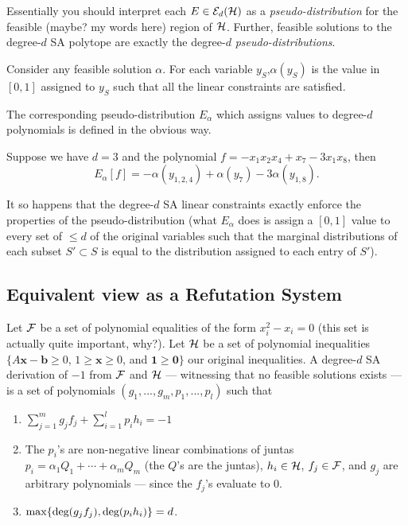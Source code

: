 Essentially you should interpret each $E \in \mathcal{E}_d(\mathcal{H})$ as a \emph{pseudo-distribution} for the feasible (maybe? my words here) region of $\mathcal{H}$. Further, feasible solutions to the degree-$d$ SA polytope are exactly the degree-$d$ \emph{pseudo-distributions}.

Consider any feasible solution $\alpha$. For each variable $y_S$,$\alpha(y_S)$ is the value in $[0,1]$ assigned to $y_S$ such that all the linear constraints are satisfied.

The corresponding pseudo-distribution $E_{\alpha}$ which assigns values to degree-$d$ polynomials is defined in the obvious way.
\begin{example}
Suppose we have $d = 3$ and the polynomial $f = -x_1x_2x_4 + x_7 - 3x_1x_8$, then
\[E_{\alpha}[f] = -\alpha(y_{1,2,4}) + \alpha(y_{7}) -3\alpha(y_{1,8}).\]
\end{example}
It so happens that the degree-$d$ SA linear constraints exactly enforce the properties of the pseudo-distribution (what $E_{\alpha}$ does is assign a $[0,1]$ value to every set of $\leq d$ of the original variables such that the marginal distributions of each subset $S' \subset S$ is equal to the distribution assigned to each entry of $S'$). 

\subsection{Equivalent view as a Refutation System}
Let $\mathcal{F}$ be a set of polynomial equalities of the form $x_i^2 - x_i = 0$ (this set is actually quite important, why?). Let $\mathcal{H}$ be a set of polynomial inequalities $\{A\mathbf{x} - \mathbf{b} \geq 0$, $1 \geq \mathbf{x} \geq 0$, and $\mathbf{1} \geq \mathbf{0}\}$ our original inequalities. A degree-$d$ SA derivation of $-1$ from $\mathcal{F}$ and $\mathcal{H}$ --- witnessing that no feasible solutions exists --- is a set of polynomials $(g_1, ..., g_m, p_1, ..., p_l)$ such that
 
\begin{enumerate}
\item $\sum_{j=1}^{m} g_jf_j + \sum_{i = 1}^{l}p_ih_i = -1$
\item The $p_i$'s are non-negative linear combinations of juntas $p_i = \alpha_1Q_1 + \cdots + \alpha_mQ_m$ (the $Q$'s are the juntas), $h_i \in \mathcal{H}$, $f_j \in \mathcal{F}$, and $g_j$ are arbitrary polynomials --- since the $f_j$'s evaluate to 0. 
\item $\max\{\mbox{deg}(g_jf_j), \mbox{deg}(p_ih_i)\} = d$.
\end{enumerate}

